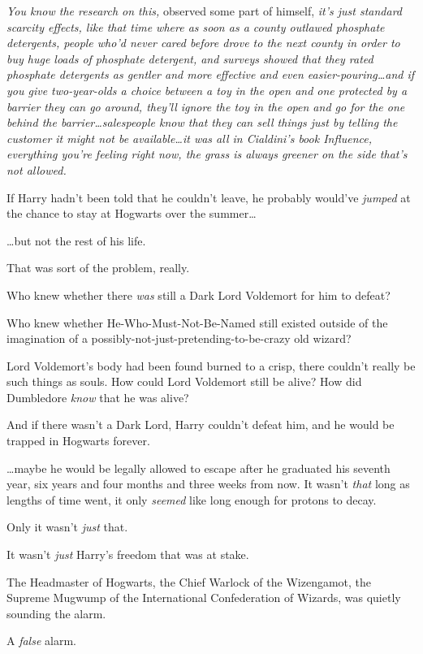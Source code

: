 \emph{You \emph{know} the research on this,} observed some part of himself,
\emph{it's just standard scarcity effects, like that time where as soon as a
county outlawed phosphate detergents, people who'd never cared before drove to
the next county in order to buy huge loads of phosphate detergent, and surveys
showed that they rated phosphate detergents as gentler and more effective and
even easier-pouring…and if you give two-year-olds a choice between a
toy in the open and one protected by a barrier they can go around, they'll
ignore the toy in the open and go for the one behind the barrier…salespeople
know that they can sell things just by telling the customer it
might not be available…it was all in Cialdini's book \emph{Influence,}
everything you're feeling right now, the grass is always greener on the side
that's not allowed.}

If Harry hadn't been told that he couldn't leave, he probably would've
\emph{jumped} at the chance to stay at Hogwarts over the summer…

…but not the rest of his life.

That was sort of the problem, really.

Who knew whether there \emph{was} still a Dark Lord Voldemort for him to defeat?

Who knew whether He-Who-Must-Not-Be-Named still existed outside of the
imagination of a possibly-not-just-pretending-to-be-crazy old wizard?

Lord Voldemort's body had been found burned to a crisp, there couldn't really
be such things as souls. How could Lord Voldemort still be alive? How did
Dumbledore \emph{know} that he was alive?

And if there wasn't a Dark Lord, Harry couldn't defeat him, and he would be
trapped in Hogwarts forever.

…maybe he would be legally allowed to escape after he graduated his
seventh year, six years and four months and three weeks from now. It wasn't
\emph{that} long as lengths of time went, it only \emph{seemed} like long
enough for protons to decay.

Only it wasn't \emph{just} that.

It wasn't \emph{just} Harry's freedom that was at stake.

The Headmaster of Hogwarts, the Chief Warlock of the Wizengamot, the Supreme
Mugwump of the International Confederation of Wizards, was quietly sounding the
alarm.

A \emph{false} alarm.

